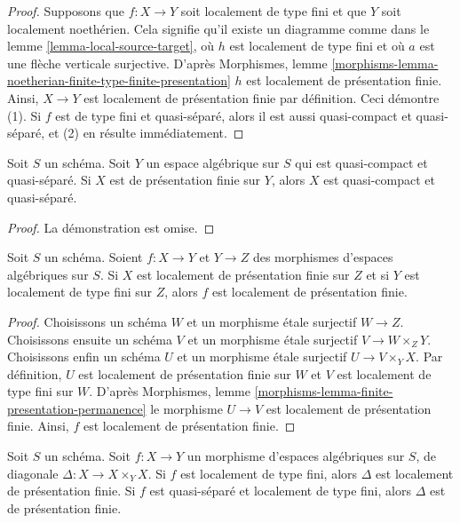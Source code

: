 \begin{proof}
Supposons que $f : X \to Y$ soit localement de type fini et que $Y$ soit localement noethérien.
Cela signifie qu'il existe un diagramme comme dans le
lemme \ref{lemma-local-source-target},
où $h$ est localement de type fini et où $a$ est une flèche verticale surjective. D'après
Morphismes, lemme
\ref{morphisms-lemma-noetherian-finite-type-finite-presentation}
$h$ est localement de présentation finie.
Ainsi, $X \to Y$ est localement de présentation finie par définition.
Ceci démontre (1).
Si $f$ est de type fini et quasi-séparé, alors il est aussi
quasi-compact et quasi-séparé, et (2) en résulte immédiatement.
\end{proof}

\begin{lemma}
\label{lemma-finite-presentation-quasi-compact-quasi-separated}
Soit $S$ un schéma. Soit $Y$ un espace algébrique sur $S$ qui est
quasi-compact et quasi-séparé. Si $X$ est de présentation finie sur
$Y$, alors $X$ est quasi-compact et quasi-séparé.
\end{lemma}

\begin{proof}
La démonstration est omise.
\end{proof}

\begin{lemma}
\label{lemma-finite-presentation-permanence}
Soit $S$ un schéma.
Soient $f : X \to Y$ et $Y \to Z$ des morphismes d'espaces algébriques sur $S$.
Si $X$ est localement de présentation finie sur $Z$ et si
$Y$ est localement de type fini sur $Z$, alors $f$ est localement
de présentation finie.
\end{lemma}

\begin{proof}
Choisissons un schéma $W$ et un morphisme étale surjectif $W \to Z$.
Choisissons ensuite un schéma $V$ et un morphisme étale surjectif $V \to W \times_Z Y$.
Choisissons enfin un schéma $U$ et un morphisme étale surjectif
$U \to V \times_Y X$. Par définition, $U$ est localement de présentation finie
sur $W$ et $V$ est localement de type fini sur $W$. D'après
Morphismes, lemme \ref{morphisms-lemma-finite-presentation-permanence}
le morphisme $U \to V$ est localement de présentation finie.
Ainsi, $f$ est localement de présentation finie.
\end{proof}

\begin{lemma}
\label{lemma-diagonal-morphism-finite-type}
Soit $S$ un schéma. Soit $f : X \to Y$ un morphisme d'espaces algébriques
sur $S$, de diagonale $\Delta : X \to X \times_Y X$. Si $f$ est localement de
type fini, alors $\Delta$ est localement de présentation finie. Si $f$ est
quasi-séparé et localement de type fini, alors $\Delta$ est de
présentation finie.
\end{lemma}

